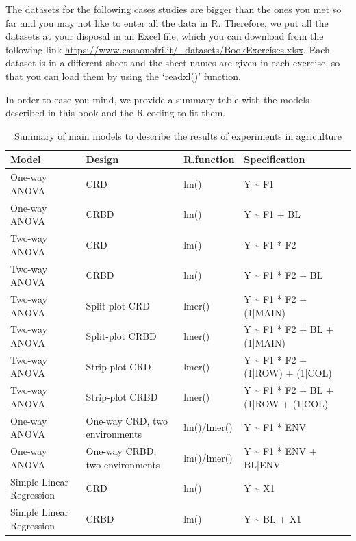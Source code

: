 \documentclass[a4paper,12pt,oneside]{book}
\begin{document}
The datasets for the following cases studies are bigger than the ones you met so far and you may not like to enter all the data in R. Therefore, we put all the datasets at your disposal in an Excel file, which you can download from the following link \url{https://www.casaonofri.it/_datasets/BookExercises.xlsx}. Each dataset is in a different sheet and the sheet names are given in each exercise, so that you can load them by using the `readxl()' function.

In order to ease you mind, we provide a summary table with the models described in this book and the R coding to fit them.

\begin{table}

\caption{\label{tab:unnamed-chunk-218}Summary of main models to describe the results of experiments in agriculture}
\centering
\begin{tabular}[t]{l|l|l|l}
\hline
Model & Design & R.function & Specification\\
\hline
One-way ANOVA & CRD & lm() & Y \textasciitilde{} F1\\
\hline
One-way ANOVA & CRBD & lm() & Y \textasciitilde{} F1 + BL\\
\hline
Two-way ANOVA & CRD & lm() & Y \textasciitilde{} F1 * F2\\
\hline
Two-way ANOVA & CRBD & lm() & Y \textasciitilde{} F1 * F2 + BL\\
\hline
Two-way ANOVA & Split-plot CRD & lmer() & Y \textasciitilde{} F1 * F2 + (1|MAIN)\\
\hline
Two-way ANOVA & Split-plot CRBD & lmer() & Y \textasciitilde{} F1 * F2 + BL + (1|MAIN)\\
\hline
Two-way ANOVA & Strip-plot CRD & lmer() & Y \textasciitilde{} F1 * F2 + (1|ROW) + (1|COL)\\
\hline
Two-way ANOVA & Strip-plot CRBD & lmer() & Y \textasciitilde{} F1 * F2 + BL + (1|ROW + (1|COL)\\
\hline
One-way ANOVA & One-way CRD, two environments & lm()/lmer() & Y \textasciitilde{} F1 * ENV\\
\hline
One-way ANOVA & One-way CRBD, two environments & lm()/lmer() & Y \textasciitilde{} F1 * ENV + BL|ENV\\
\hline
Simple Linear Regression & CRD & lm() & Y \textasciitilde{} X1\\
\hline
Simple Linear Regression & CRBD & lm() & Y \textasciitilde{} BL + X1\\
\hline
\end{tabular}
\end{table}
\end{document}
